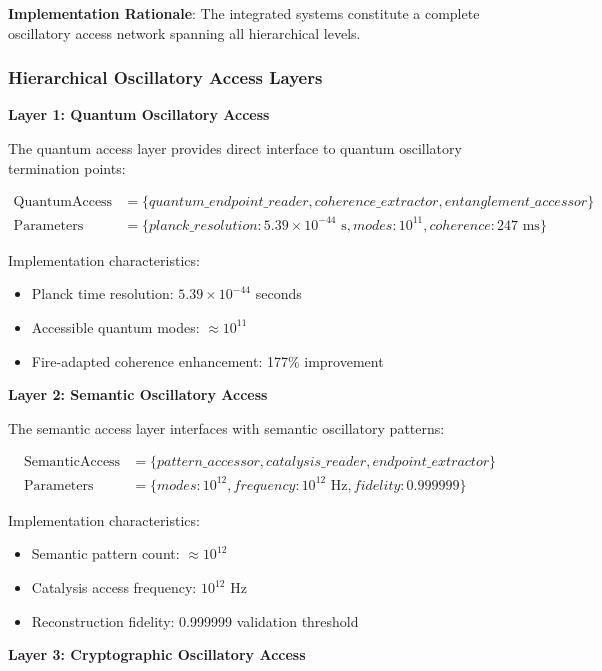 \documentclass[12pt,a4paper]{article}
\begin{document}
{\textbf{Implementation Rationale}: The integrated systems constitute a complete oscillatory access network spanning all hierarchical levels.

\subsubsection{Hierarchical Oscillatory Access Layers}

\textbf{Layer 1: Quantum Oscillatory Access}

The quantum access layer provides direct interface to quantum oscillatory termination points:

\begin{align}
\text{QuantumAccess} &= \{quantum\_endpoint\_reader, coherence\_extractor, entanglement\_accessor\} \\
\text{Parameters} &= \{planck\_resolution: 5.39 \times 10^{-44} \text{ s}, modes: 10^{11}, coherence: 247 \text{ ms}\}
\end{align}

Implementation characteristics:
\begin{itemize}
\item Planck time resolution: $5.39 \times 10^{-44}$ seconds
\item Accessible quantum modes: $\approx 10^{11}$
\item Fire-adapted coherence enhancement: 177\% improvement
\end{itemize}

\textbf{Layer 2: Semantic Oscillatory Access}

The semantic access layer interfaces with semantic oscillatory patterns:

\begin{align}
\text{SemanticAccess} &= \{pattern\_accessor, catalysis\_reader, endpoint\_extractor\} \\
\text{Parameters} &= \{modes: 10^{12}, frequency: 10^{12} \text{ Hz}, fidelity: 0.999999\}
\end{align}

Implementation characteristics:
\begin{itemize}
\item Semantic pattern count: $\approx 10^{12}$
\item Catalysis access frequency: $10^{12}$ Hz
\item Reconstruction fidelity: 0.999999 validation threshold
\end{itemize}

\textbf{Layer 3: Cryptographic Oscillatory Access}

}
\end{document}
